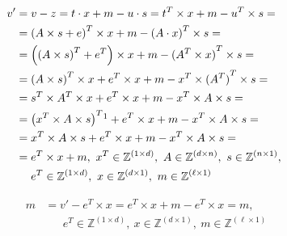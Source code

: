 \documentclass[runningheads]{llncs}
\numberwithin{equation}{section}
\begin{document}
    \begin{equation*}
        \begin{split}
            v' & = v - z = t \cdot x + m - u \cdot s = {t}^{T} \times x + m - {u}^{T} \times s = \\
            & = {(A \times s + e)}^{T} \times x + m - {(A \cdot x)}^{T} \times s = \\
            & = \left( {(A \times s)}^{T} + {e}^{T} \right) \times x + m - {({A}^{T} \times x)}^{T} \times s = \\
            & = {(A \times s)}^{T} \times x + {e}^{T} \times x + m - {x}^{T} \times {({A}^{T})}^{T} \times s = \\
            & = {s}^{T} \times {A}^{T} \times x + {e}^{T} \times x + m - {x}^{T} \times A \times s = \\
            & = {\left( {x}^{T} \times A \times s \right)}^{T}\footnotemark + {e}^{T} \times x + m - {x}^{T} \times A \times s = \\
            & = {x}^{T} \times A \times s + {e}^{T} \times x + m - {x}^{T} \times A \times s = \\
            & = {e}^{T} \times x + m,\ {x}^{T} \in {\mathbb{Z}}^{(1 \times d)},\ A \in {\mathbb{Z}}^{(d \times n)},\ s \in {\mathbb{Z}}^{(n \times 1)},\ \\
            & \phantom{=.} {e}^{T} \in {\mathbb{Z}}^{(1 \times d)},\ x \in {\mathbb{Z}}^{(d \times 1)},\ m \in {\mathbb{Z}}^{(\ell \times 1)} \\
        \end{split}
    \end{equation*}
    
    \begin{equation*}
        \begin{split}
            m & = v' - {e}^{T} \times x = {e}^{T} \times x + m - {e}^{T} \times x = m,\\
            & \phantom{=.} {e}^{T} \in {\mathbb{Z}}^{(1 \times d)},\ x \in {\mathbb{Z}}^{(d \times 1)},\ m \in {\mathbb{Z}}^{(\ell \times 1)}
        \end{split}
    \end{equation*}
\end{document}
